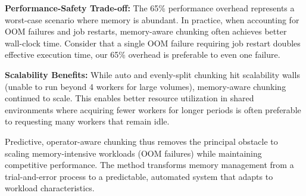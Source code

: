 \textbf{Performance-Safety Trade-off:} The 65\% performance overhead represents a worst-case scenario where memory is abundant.
In practice, when accounting for \ac{OOM} failures and job restarts, memory-aware chunking often achieves better wall-clock time.
Consider that a single \ac{OOM} failure requiring job restart doubles effective execution time, our 65\% overhead is preferable to even one failure.

\textbf{Scalability Benefits:} While auto and evenly-split chunking hit scalability walls (unable to run beyond 4 workers for large volumes), memory-aware chunking continued to scale.
This enables better resource utilization in shared environments where acquiring fewer workers for longer periods is often preferable to requesting many workers that remain idle.

Predictive, operator-aware chunking thus removes the principal obstacle to scaling memory-intensive workloads (\ac{OOM} failures) while maintaining competitive performance.
The method transforms memory management from a trial-and-error process to a predictable, automated system that adapts to workload characteristics.